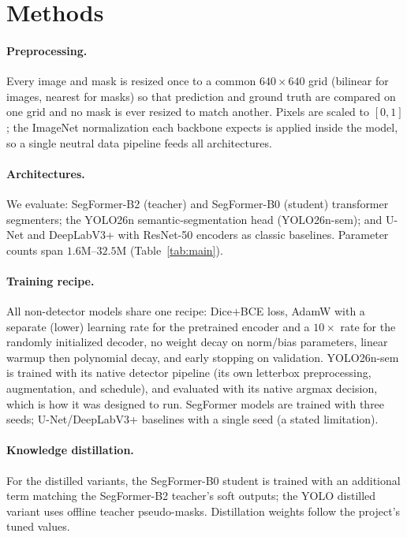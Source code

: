 \documentclass[letterpaper,twocolumn,10pt]{article}
\begin{document}
\section{Methods}
\paragraph{Preprocessing.}
Every image and mask is resized once to a common $640{\times}640$ grid (bilinear
for images, nearest for masks) so that prediction and ground truth are compared on
one grid and no mask is ever resized to match another. Pixels are scaled to
$[0,1]$; the ImageNet normalization each backbone expects is applied inside the
model, so a single neutral data pipeline feeds all architectures.

\paragraph{Architectures.}
We evaluate: SegFormer-B2 (teacher) and SegFormer-B0 (student) transformer
segmenters; the YOLO26n semantic-segmentation head (YOLO26n-sem); and U-Net and
DeepLabV3+ with ResNet-50 encoders as classic baselines. Parameter counts span
$1.6$M--$32.5$M (Table~\ref{tab:main}).

\paragraph{Training recipe.}
All non-detector models share one recipe: Dice$+$BCE loss, AdamW with a separate
(lower) learning rate for the pretrained encoder and a $10{\times}$ rate for the
randomly initialized decoder, no weight decay on norm/bias parameters, linear
warmup then polynomial decay, and early stopping on validation. YOLO26n-sem is
trained with its native detector pipeline (its own letterbox preprocessing,
augmentation, and schedule), and evaluated with its native argmax decision, which
is how it was designed to run. SegFormer models are trained with three seeds;
U-Net/DeepLabV3+ baselines with a single seed (a stated limitation).

\paragraph{Knowledge distillation.}
For the distilled variants, the SegFormer-B0 student is trained with an additional
term matching the SegFormer-B2 teacher's soft outputs; the YOLO distilled variant
uses offline teacher pseudo-masks. Distillation weights follow the project's
tuned values.
\end{document}
